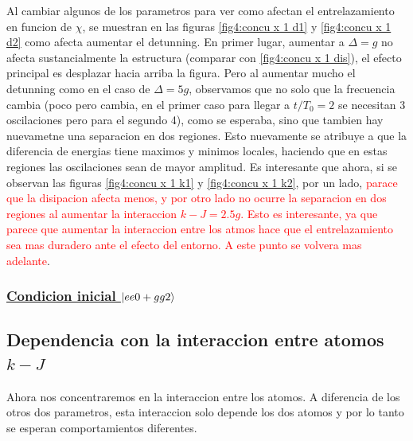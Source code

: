 Al cambiar algunos de los parametros para ver como afectan el entrelazamiento en funcion de $\chi$, se muestran en las figuras \ref{fig4:concu x 1 d1} y \ref{fig4:concu x 1 d2} como afecta aumentar el detunning. En primer lugar, aumentar a $\Delta=g$ no afecta sustancialmente la estructura (comparar con \ref{fig4:concu x 1 dis}), el efecto principal es desplazar hacia arriba la figura. Pero al aumentar mucho el detunning como en el caso de $\Delta=5g$, observamos que no solo que la frecuencia cambia (poco pero cambia, en el primer caso para llegar a $t/T_0=2$ se necesitan 3 oscilaciones pero para el segundo 4), como se esperaba, sino que tambien hay nuevametne una separacion en dos regiones. Esto nuevamente se atribuye a que la diferencia de energias tiene maximos y minimos locales, haciendo que en estas regiones las oscilaciones sean de mayor amplitud. Es interesante que ahora, si se observan las figuras \ref{fig4:concu x 1 k1} y \ref{fig4:concu x 1 k2}, por un lado, \textcolor{red}{parace que la disipacion afecta menos, y por otro lado no ocurre la separacion en dos regiones al aumentar la interaccion $k-J=2.5g$. Esto es interesante, ya que parece que aumentar la interaccion entre los atmos hace que el entrelazamiento sea mas duradero ante el efecto del entorno. A este punto se volvera mas adelante}.
\subsubsection{\underline{Condicion inicial $\ket{ee0+gg2}$}}

\newpage
\subsection{Dependencia con la interaccion entre atomos $k-J$}
Ahora nos concentraremos en la interaccion entre los atomos. A diferencia de los otros dos parametros, esta interaccion solo depende los dos atomos y por lo tanto se esperan comportamientos diferentes. 
